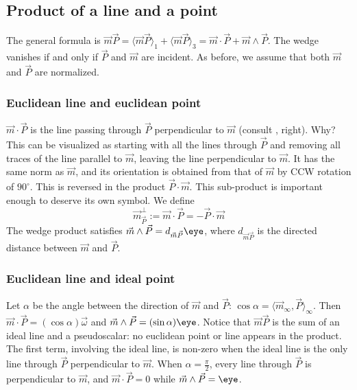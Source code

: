 \documentclass[12pt]{article}
\begin{document}
\subsection{Product of a line and a point}
\label{sec:prlnpt}
The general formula is $\vec{m} \vec{P} =  \langle \vec{m}\vec{P}\rangle_{1} +\langle \vec{m}\vec{P}\rangle_{3} = \vec{m} \cdot \vec{P} + \vec{m} \wedge \vec{P}$.  The wedge vanishes if and only if $\vec{P}$ and $\vec{m}$ are incident.  As before, we assume that both $\vec{m}$ and $\vec{P}$ are normalized.

\subsubsection{Euclidean line and euclidean point}   $ \vec{m} \cdot \vec{P} $ is the line passing through $\vec{P}$ perpendicular to $\vec{m}$ (consult , right). Why? This can be visualized as starting with all the lines through $\vec{P}$ and removing all traces of the line parallel to $\vec{m}$, leaving the line perpendicular to $\vec{m}$.  %
It has the same norm as $\vec{m}$, and its orientation is obtained from that of $\vec{m}$ by CCW rotation of $90^{\circ}$.  This is reversed in the product $\vec{P} \cdot \vec{m}$.  This sub-product is important enough to deserve its own symbol.  We define \[\vec{m}^{\perp}_{\vec{P}} := \vec{m} \cdot \vec{P} = - \vec{P} \cdot \vec{m}\]  The wedge product satisfies $\vec{m}\wedge \vec{P} = d_{\vec{m}\vec{P}}\eye$, where $d_{\vec{m}\vec{P}}$ is the directed distance between $\vec{m}$ and $\vec{P}$.   %

\subsubsection{Euclidean line and ideal point}  Let $\alpha$ be the angle between the direction of $\vec{m}$ and $\vec{P}$: $\cos{\alpha} = \langle \vec{m}_{\infty}, \vec{P} \rangle_{\infty}$. Then $ \vec{m} \cdot \vec{P} = (\cos{\alpha})\vec{\omega}$ and $\vec{m}\wedge \vec{P} = (\sin{\alpha}) \eye$.  
Notice that $\vec{m} \vec{P}$ is the sum of an  ideal line and a pseudoscalar: no euclidean point or line appears in the product. The first term, involving the ideal line, is non-zero when the ideal line is the only line through $\vec{P}$ perpendicular to $\vec{m}$.  When $\alpha = \frac{\pi}{2}$, every line through $\vec{P}$ is   perpendicular to $\vec{m}$, and $\vec{m} \cdot \vec{P} = 0$ while $\vec{m}\wedge \vec{P}  = \eye$.  
\end{document}
